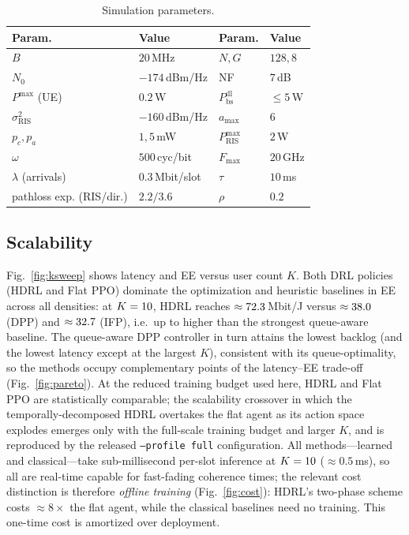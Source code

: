 \documentclass[conference]{IEEEtran}
\begin{document}
\begin{table}[t]
\caption{Simulation parameters.}
\label{tab:params}
\centering
\footnotesize
\begin{tabular}{@{}llll@{}}
\toprule
Param. & Value & Param. & Value\\
\midrule
$B$ & $20$\,MHz & $N,G$ & $128,8$\\
$N_0$ & $-174$\,dBm/Hz & NF & $7$\,dB\\
$P^{\max}$ (UE) & $0.2$\,W & $P_{\mathrm{bs}}^{\mathrm{dl}}$ & $\le 5$\,W\\
$\sigma_{\mathrm{RIS}}^2$ & $-160$\,dBm/Hz & $a_{\max}$ & $6$\\
$p_c,p_a$ & $1,5$\,mW & $P_{\mathrm{RIS}}^{\max}$ & $2$\,W\\
$\omega$ & $500$\,cyc/bit & $F_{\max}$ & $20$\,GHz\\
$\lambda$ (arrivals) & $0.3$\,Mbit/slot & $\tau$ & $10$\,ms\\
pathloss exp. (RIS/dir.) & $2.2/3.6$ & $\rho$ & $0.2$\\
\bottomrule
\end{tabular}
\end{table}

\subsection{Scalability}
Fig.~\ref{fig:ksweep} shows latency and EE versus user count $K$. Both DRL policies
(HDRL and Flat PPO) dominate the optimization and heuristic baselines in EE across
all densities: at $K=10$, HDRL reaches $\approx72.3$\,Mbit/J versus
$\approx38.0$ (DPP) and $\approx32.7$ (IFP), i.e.\ up to \eeGainPct{} higher than
the strongest queue-aware baseline. The queue-aware DPP controller in turn attains
the lowest backlog (and the lowest latency except at the largest $K$), consistent
with its queue-optimality, so the methods occupy complementary points of the
latency--EE trade-off (Fig.~\ref{fig:pareto}). At
the reduced training budget used here, HDRL and Flat PPO are statistically
comparable; the scalability crossover in which the temporally-decomposed HDRL
overtakes the flat agent as its action space explodes emerges only with the
full-scale training budget and larger $K$, and is reproduced by the released
\texttt{--profile full} configuration. All methods---learned and classical---take
sub-millisecond per-slot inference at $K=10$ ($\approx\!0.5$\,ms), so all are
real-time capable for fast-fading coherence times; the relevant cost distinction is
therefore \emph{offline training} (Fig.~\ref{fig:cost}): HDRL's two-phase scheme costs
$\approx\!8\times$ the flat agent, while the classical baselines need no training.
This one-time cost is amortized over deployment.
\end{document}
